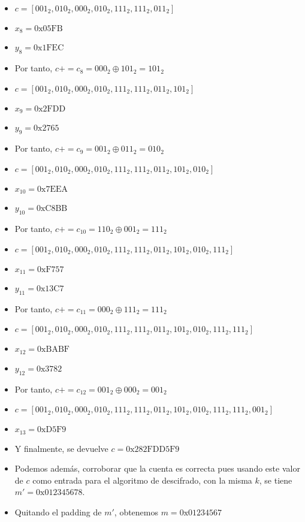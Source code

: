 \begin{enumerate}
\begin{itemize}
			\item $c = [001_2, 010_2, 000_2, 010_2, 111_2, 111_2, 011_2]$
			\item $x_8 = \mathrm{0x05FB}$
			\item $y_8 = \mathrm{0x1FEC}$
			\item Por tanto, $c += c_8 = 000_2 \oplus 101_2 = 101_2$
			\item $c = [001_2, 010_2, 000_2, 010_2, 111_2, 111_2, 011_2, 101_2]$
			\item $x_9 = \mathrm{0x2FDD}$
			\item $y_9 = \mathrm{0x2765}$
			\item Por tanto, $c += c_9 = 001_2 \oplus 011_2 = 010_2$
			\item $c = [001_2, 010_2, 000_2, 010_2, 111_2, 111_2, 011_2, 101_2, 010_2]$
			\item $x_{10} = \mathrm{0x7EEA}$
			\item $y_{10} = \mathrm{0xC8BB}$
			\item Por tanto, $c += c_{10} = 110_2 \oplus 001_2 = 111_2$
			\item $c = [001_2, 010_2, 000_2, 010_2, 111_2, 111_2, 011_2, 101_2, 010_2, 111_2]$
			\item $x_{11} = \mathrm{0xF757}$
			\item $y_{11} = \mathrm{0x13C7}$
			\item Por tanto, $c += c_{11} = 000_2 \oplus 111_2 = 111_2$
			\item $c = [001_2, 010_2, 000_2, 010_2, 111_2, 111_2, 011_2, 101_2, 010_2, 111_2, 111_2]$
			\item $x_{12} = \mathrm{0xBABF}$
			\item $y_{12} = \mathrm{0x3782}$
			\item Por tanto, $c += c_{12} = 001_2 \oplus 000_2 = 001_2$
			\item $c = [001_2, 010_2, 000_2, 010_2, 111_2, 111_2, 011_2, 101_2, 010_2, 111_2, 111_2, 001_2]$
			\item $x_{13} = \mathrm{0xD5F9}$
			\item Y finalmente, se devuelve $c = \mathrm{0x282FDD5F9}$
			\item Podemos además, corroborar que la cuenta es correcta pues usando este valor de $c$ como
			entrada para el algoritmo de descifrado, con la misma $k$, se tiene $m' = \mathrm{0x012345678}$.
			\item Quitando el padding de $m'$, obtenemos $m = \mathrm{0x01234567}$
		\end{itemize}
	\end{enumerate}
